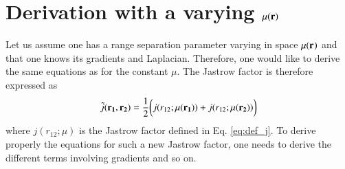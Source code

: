\documentclass[aip,jcp,reprint,noshowkeys,superscriptaddress]{revtex4-1}
\newcommand{\bd}[1]{{\bf {#1}}}
\newcommand{\mur}[1]{\mu({\bf r_{#1}})}
\begin{document}
\section{Derivation with a varying $\mu({\bf r})$}
Let us assume one has a range separation parameter varying in space $\mur{}$ and that one knows its gradients and Laplacian. 
Therefore, one would like to derive the same equations as for the constant $\mu$. 
The Jastrow factor is therefore expressed as
\begin{equation}
 \tilde{j}(\bd{r_1},\bd{r_2}) = \frac{1}{2}\bigg( j(r_{12};\mur{1}) + j(r_{12};\mur{2}) \bigg)
\end{equation}
where $j(r_{12};\mu)$ is the Jastrow factor defined in Eq. \eqref{eq:def_j}. 
To derive properly the equations for such a new Jastrow factor, one needs to derive the different terms involving gradients and so on. 
\end{document}
